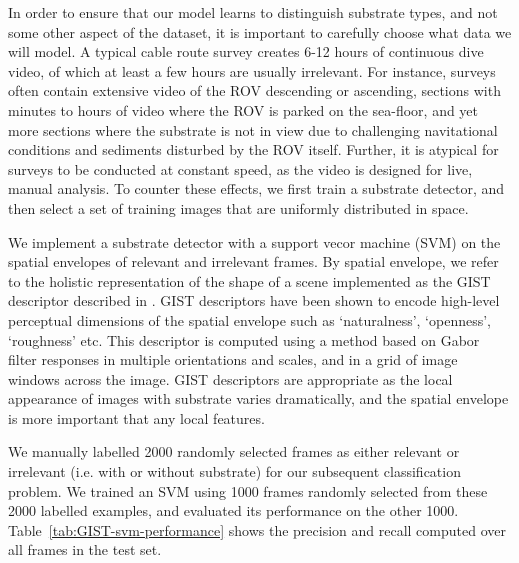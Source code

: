 In order to ensure that our model learns to distinguish substrate types, and not some other aspect of the dataset, it is important to carefully choose what data we will model.
A typical cable route survey creates 6-12 hours of continuous dive video, of which at least a few hours are usually irrelevant. For instance, surveys often contain extensive video of the ROV descending or ascending, sections with minutes to hours of video where the ROV is parked on the sea-floor, and yet more sections where the substrate is not in view due to challenging navitational conditions and sediments disturbed by the ROV itself.
Further, it is atypical for surveys to be conducted at constant speed, as the video is designed for live, manual analysis. To counter these effects, we first train a substrate detector, and then select a set of training images that are uniformly distributed in space.

We implement a substrate detector with a support vecor machine (SVM) on the spatial envelopes of relevant and irrelevant frames.
By spatial envelope, we refer to the holistic representation of the shape of a scene implemented as the GIST
descriptor described in \citep{oliva2001GIST}. GIST descriptors have been shown to encode high-level perceptual dimensions of the
spatial envelope such as ‘naturalness’, ‘openness’, ‘roughness’ etc. This descriptor is computed using a method based on Gabor filter responses in multiple orientations and scales, and in a grid of image windows across the image. GIST descriptors are appropriate as the local appearance of images with substrate varies dramatically, and the spatial envelope is more important that any local features.

We manually labelled 2000 randomly selected frames as either relevant or irrelevant (i.e. with or without substrate) for our subsequent classification problem. We trained an SVM using 1000 frames randomly selected from these 2000 labelled examples, and evaluated its performance on the other 1000. Table~\ref{tab:GIST-svm-performance} shows the precision and recall computed over all frames in the test set.

